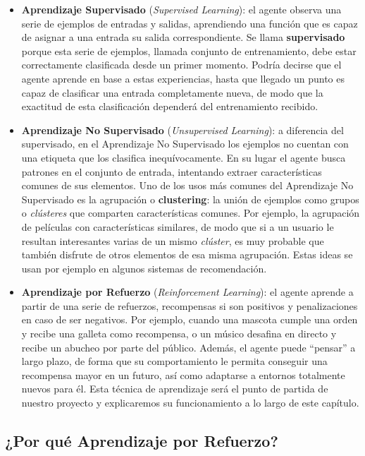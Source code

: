 \begin{itemize}
    \item \textbf{Aprendizaje Supervisado} (\textit{Supervised Learning}): el agente observa una serie de ejemplos de entradas y salidas, aprendiendo una función que es capaz de asignar a una entrada su salida correspondiente. Se llama \textbf{supervisado} porque esta serie de ejemplos, llamada conjunto de entrenamiento, debe estar correctamente clasificada desde un primer momento. Podría decirse que el agente aprende en base a estas experiencias, hasta que llegado un punto es capaz de clasificar una entrada completamente nueva, de modo que la exactitud de esta clasificación dependerá del entrenamiento recibido.
    \item \textbf{Aprendizaje No Supervisado} (\textit{Unsupervised Learning}): a diferencia del supervisado, en el Aprendizaje No Supervisado los ejemplos no cuentan con una etiqueta que los clasifica inequívocamente. En su lugar el agente busca patrones en el conjunto de entrada, intentando extraer características comunes de sus elementos. Uno de los usos más comunes del Aprendizaje No Supervisado es la agrupación o \textbf{clustering}: la unión de ejemplos como grupos o \textit{clústeres} que comparten características comunes. Por ejemplo, la agrupación de películas con características similares, de modo que si a un usuario le resultan interesantes varias de un mismo \textit{clúster}, es muy probable que también disfrute de otros elementos de esa misma agrupación. Estas ideas se usan por ejemplo en algunos sistemas de recomendación.   
    \item \textbf{Aprendizaje por Refuerzo} (\textit{Reinforcement Learning}): el agente aprende a partir de una serie de refuerzos, recompensas si son positivos y penalizaciones en caso de ser negativos. Por ejemplo, cuando una mascota cumple una orden y recibe una galleta como recompensa, o un músico desafina en directo y recibe un abucheo por parte del público. Además, el agente puede ``pensar'' a largo plazo, de forma que su comportamiento le permita conseguir una recompensa mayor en un futuro, así como adaptarse a entornos totalmente nuevos para él. Esta técnica de aprendizaje será el punto de partida de nuestro proyecto y explicaremos su funcionamiento a lo largo de este capítulo. 
\end{itemize}


\subsection{¿Por qué Aprendizaje por Refuerzo?}


